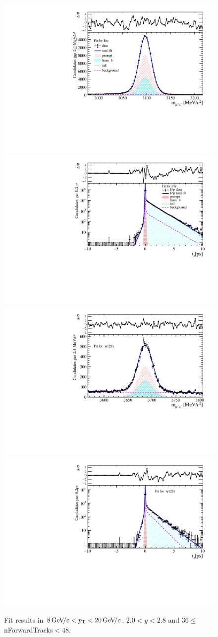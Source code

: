 \begin{figure}[H]
\begin{center}
\includegraphics[width=0.47\linewidth]{pdf/Jpsi/drawmassF/n4y1pt5.pdf}
\includegraphics[width=0.47\linewidth]{pdf/Jpsi/2DFitF/n4y1pt5.pdf}
\vspace*{-0.5cm}
\includegraphics[width=0.47\linewidth]{pdf/Psi2S/drawmassF/n4y1pt5.pdf}
\includegraphics[width=0.47\linewidth]{pdf/Psi2S/2DFitF/n4y1pt5.pdf}
\vspace*{-0.5cm}
\end{center}
\caption{Fit results in $8\text{\,Ge\kern -0.1em V\!/}c<p_{\mathrm{T}}<20\text{\,Ge\kern -0.1em V\!/}c$, $2.0<y<2.8$ and 36$\leq$nForwardTracks$<$48.}
\label{Fitn4y1pt5}
\end{figure}

